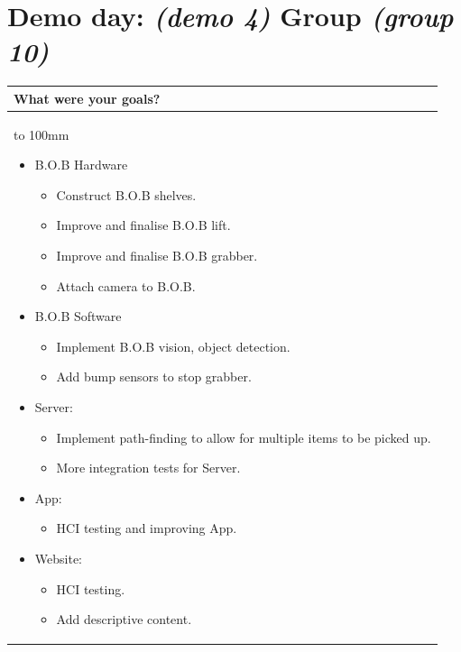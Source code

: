 \documentclass[a4paper]{article}
\newcommand{\colWidth}{141mm}
\begin{document}
 
\section*{Demo day: \textit{(demo 4)} Group \textit{(group 10)}}


\begin{center}
\begin{tabular}{|p{\colWidth}|}
	\hline
	\cellcolor{blue!25}\large
	\textbf{What were your goals?}
	\\ \hline
	\vtop to 100mm{
\begin{itemize}
    \item B.O.B Hardware
    \begin{itemize}
         \item Construct B.O.B shelves.
         \item Improve and finalise B.O.B lift. 
         \item Improve and finalise B.O.B grabber. 
         \item Attach camera to B.O.B.
    \end{itemize}
    \item B.O.B Software
    \begin{itemize} 
        \item Implement B.O.B vision, object detection.
        \item Add bump sensors to stop grabber.
    \end{itemize}
    \item Server: 
    \begin{itemize}
        \item Implement path-finding to allow for multiple items to be picked up.
        \item More integration tests for Server.
    \end{itemize}
    \item App:
    \begin{itemize}
        \item HCI testing and improving App.
    \end{itemize}
    \item Website: 
    \begin{itemize}
        \item HCI testing.
        \item Add descriptive content.
    \end{itemize}
\end{itemize}
  }
  \\
  \hline
\end{tabular}
\vskip 5mm


\end{center}
\end{document}
